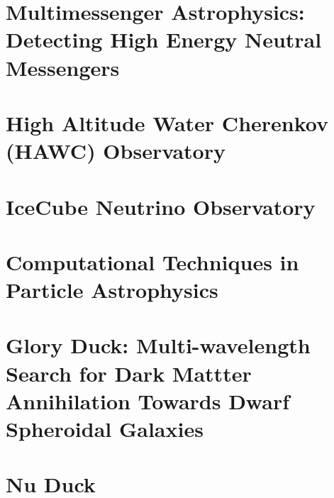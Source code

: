 \documentclass[PhD]{msu-thesis}
\begin{document}
\chapter{Multimessenger Astrophysics: Detecting High Energy Neutral Messengers\label{sec:multmessenger}}


\chapter{High Altitude Water Cherenkov (HAWC) Observatory\label{sec:hawc}}


\chapter{IceCube Neutrino Observatory\label{sec:ice3}}


\chapter{Computational Techniques in Particle Astrophysics}


\chapter{Glory Duck: Multi-wavelength Search for Dark Mattter Annihilation Towards Dwarf Spheroidal Galaxies \label{sec:glory_duck}}


\chapter{Nu Duck\label{sec:nu_duck}}

\backmatter
\SingleSpacing
\printbibliography
\end{document}
